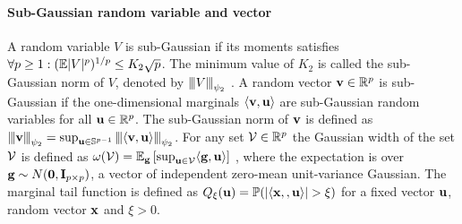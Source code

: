 \paragraph{Sub-Gaussian random variable and vector}
A random variable $V$ is sub-Gaussian if its moments satisfies $\forall p \geq 1: (\mathbb{E} |V|^p )^{1/p} \leq K_2 \sqrt{p}$.
The minimum value of $K_2$ is called the sub-Gaussian  norm of $V$, denoted by ${\left\vert\kern-0.25ex\left\vert\kern-0.25ex\left\vert V \right\vert\kern-0.25ex\right\vert\kern-0.25ex\right\vert}_{\psi_2}$ \cite{vers12}.
A random vector $\mathbf{v} \in \mathbb R^p$ is sub-Gaussian if the one-dimensional marginals $\langle \mathbf{v}, \mathbf{u} \rangle$ are sub-Gaussian random variables for all $\mathbf{u} \in \mathbb R^p$. The sub-Gaussian norm of $\mathbf{v}$ is defined \cite{vers12} as ${\left\vert\kern-0.25ex\left\vert\kern-0.25ex\left\vert \mathbf{v} \right\vert\kern-0.25ex\right\vert\kern-0.25ex\right\vert}_{\psi_2} = \sup_{\mathbf{u} \in \mathbb S^{p-1}} {\left\vert\kern-0.25ex\left\vert\kern-0.25ex\left\vert \langle \mathbf{v}, \mathbf{u} \rangle \right\vert\kern-0.25ex\right\vert\kern-0.25ex\right\vert}_{\psi_2}$.
For any set $\cV \in \reals^p$ the Gaussian width of the set $\cV$ is defined as $\omega(\cV) = \ex_\g \left[ \sup_{\u \in \cV} \langle \g, \u \rangle \right]$ \cite{vershynin2018high}, where the expectation is over $\mathbf{g} \sim N(\mathbf{0}, \mathbf{I}_{p \times p})$, a vector of independent zero-mean unit-variance Gaussian. The marginal tail function is defined as $Q_{\xi}(\mathbf{u}) = \mathbb{P}(|\langle \mathbf{x}, , \mathbf{u} \rangle| > \xi)$ for a fixed vector $\mathbf{u}$, random vector $\mathbf{x}$ and $\xi > 0$. 



